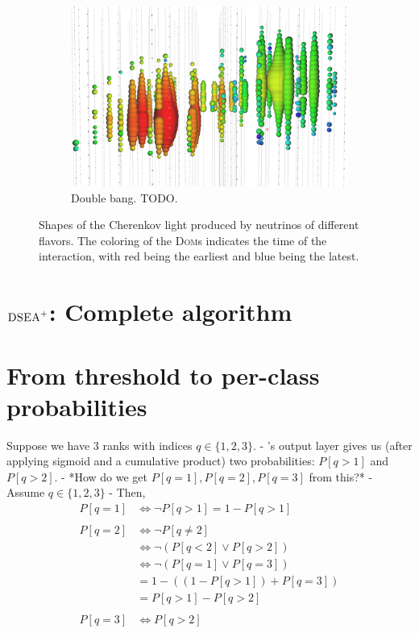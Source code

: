 \begin{figure}
  \begin{subfigure}{0.3\textwidth}
    \centering
    \includegraphics[width=\textwidth]{content/img/signatures/double_bang.png}
    \caption{
        Double bang. TODO.
    }
  \end{subfigure}
  \caption{
    Shapes of the Cherenkov light produced by neutrinos of different flavors.
    The coloring of the \textsc{Dom}s indicates the time of the interaction,
    with red being the earliest and blue being the latest.
    \cite{kowalski2017} %
  }
  \label{fig:img:icecube:interactions}
\end{figure}


\clearpage
\section{$\text{\textsc{DSEA}}^+$: Complete algorithm} \label{sec:alg:dseaplus}



\clearpage
\section{From threshold to per-class probabilities}
\label{sec:appendix:corn_probas}
Suppose we have 3 ranks with indices $q \in \{1, 2, 3\}$.
- \corn{}'s output layer gives us (after applying sigmoid and a cumulative product) two probabilities:
	$P[q>1]$ and
	$P[q>2]$.
- *How do we get $P[q=1], P[q=2], P[q=3]$ from this?*
- Assume $q \in \{1,2,3\}$
- Then,
\begin{align*}
  P[q=1] &\iff \neg P[q>1] = 1 - P[q>1] \\
  \\
  P[q=2] &\iff \neg P[q≠2] \\
  &\iff \neg(P[q<2] \lor P[q>2]) \\
  &\iff \neg(P[q=1] \lor P[q=3]) \\
  &= 1 - ((1 - P[q>1]) + P[q=3]) \\
  &= P[q>1] - P[q>2] \\
  \\
  P[q=3] &\iff P[q>2]
\end{align*}


